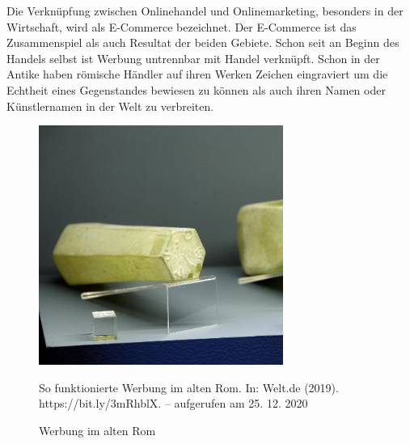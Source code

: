 Die Verknüpfung zwischen Onlinehandel und Onlinemarketing, besonders in der Wirtschaft, wird als E-Commerce bezeichnet. Der E-Commerce ist das Zusammenspiel als auch Resultat der beiden Gebiete. Schon seit an Beginn des Handels selbst ist Werbung untrennbar mit Handel verknüpft. Schon in der Antike haben römische Händler auf ihren Werken Zeichen eingraviert um die Echtheit eines Gegenstandes bewiesen zu können als auch ihren Namen oder Künstlernamen in der Welt zu verbreiten.

\begin{figure}[h]
    \begin{center}
        \includegraphics[width=8cm]{media/5.png}
        \caption{Werbung im alten Rom}
        \label{werbung-rom}
        \bildquelle So funktionierte Werbung im alten Rom. In: Welt.de (2019). https://bit.ly/3mRhblX. – aufgerufen am 25. 12. 2020

    \end{center}
\end{figure}
